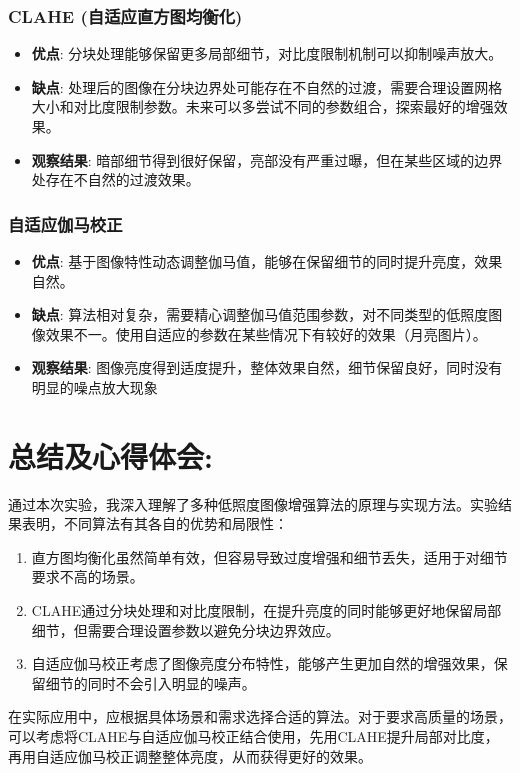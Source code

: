 \documentclass[a4paper,11pt,UTF8]{ctexart}
\begin{document}
\subsubsection{CLAHE (自适应直方图均衡化)}
\begin{itemize}
    \item \textbf{优点}: 分块处理能够保留更多局部细节，对比度限制机制可以抑制噪声放大。
    \item \textbf{缺点}: 处理后的图像在分块边界处可能存在不自然的过渡，需要合理设置网格大小和对比度限制参数。未来可以多尝试不同的参数组合，探索最好的增强效果。
    \item \textbf{观察结果}: 暗部细节得到很好保留，亮部没有严重过曝，但在某些区域的边界处存在不自然的过渡效果。
\end{itemize}

\subsubsection{自适应伽马校正}
\begin{itemize}
    \item \textbf{优点}: 基于图像特性动态调整伽马值，能够在保留细节的同时提升亮度，效果自然。
    \item \textbf{缺点}: 算法相对复杂，需要精心调整伽马值范围参数，对不同类型的低照度图像效果不一。使用自适应的参数在某些情况下有较好的效果（月亮图片）。
    \item \textbf{观察结果}: 图像亮度得到适度提升，整体效果自然，细节保留良好，同时没有明显的噪点放大现象
\end{itemize}

\section{总结及心得体会:}
通过本次实验，我深入理解了多种低照度图像增强算法的原理与实现方法。实验结果表明，不同算法有其各自的优势和局限性：

\begin{enumerate}
    \item 直方图均衡化虽然简单有效，但容易导致过度增强和细节丢失，适用于对细节要求不高的场景。
    \item CLAHE通过分块处理和对比度限制，在提升亮度的同时能够更好地保留局部细节，但需要合理设置参数以避免分块边界效应。
    \item 自适应伽马校正考虑了图像亮度分布特性，能够产生更加自然的增强效果，保留细节的同时不会引入明显的噪声。
\end{enumerate}

在实际应用中，应根据具体场景和需求选择合适的算法。对于要求高质量的场景，可以考虑将CLAHE与自适应伽马校正结合使用，先用CLAHE提升局部对比度，再用自适应伽马校正调整整体亮度，从而获得更好的效果。
\end{document}
